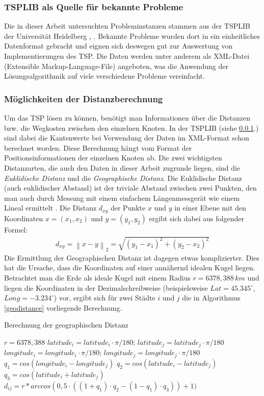 \documentclass[doktyp=barbeit, sprache=german]{TUBAFarbeiten}
\begin{document}
\subsubsection{TSPLIB als Quelle für bekannte Probleme} \label{TSPLIB}
Die in dieser Arbeit untersuchten Probleminstanzen stammen aus der TSPLIB der Universität Heidelberg \cite{TSPLIB}, \cite{WebsiteTSP}. Bekannte Probleme wurden dort in ein einheitliches Datenformat gebracht und eignen sich deswegen gut zur Auswertung von Implementierungen des TSP. Die Daten werden unter anderem als XML-Datei (Extensible Markup-Language-File) angeboten, was die Anwendung der Lösungsalgorithmik auf viele verschiedene Probleme vereinfacht. 
\subsubsection{Möglichkeiten der Distanzberechnung}
Um das TSP lösen zu können, benötigt man Informationen über die Distanzen bzw. die Wegkosten zwischen den einzelnen Knoten. In der TSPLIB (siehe \ref{TSPLIB}.) sind dabei die Kantenwerte bei Verwendung der Daten im XML-Format schon berechnet worden. Diese Berechnung hängt vom Format der Positionsinformationen der einzelnen Knoten ab. Die zwei wichtigsten Distanzarten, die auch den Daten in dieser Arbeit zugrunde liegen, sind die \textit{Euklidische Distanz} und die \textit{Geographische Distanz}. Die Euklidische Distanz (auch euklidischer Abstand) ist der triviale Abstand zwischen zwei Punkten, den man auch durch Messung mit einem einfachem Längenmessgerät wie einem Lineal ermittelt \cite{Distanz}. Die Distanz $d_{xy}$ der Punkte $x$ und $y$ in einer Ebene mit den Koordinaten $x = (x_1, x_2)$ und $y = (y_1, y_2)$ ergibt sich dabei aus folgender Formel:
\begin{align}
\label{eq:Euclid}
d_{xy} = \left\| x - y \right\|_2 = \sqrt{{(y_1-x_1)}^2+{(y_2-x_2)}^2}
\end{align}
Die Ermittlung der Geographischen Distanz ist dagegen etwas komplizierter. Dies hat die Ursache, dass die Koordinaten auf einer annähernd idealen Kugel liegen. Betrachtet man die Erde als ideale Kugel mit einem Radius $r = 6378,388 \,km$ und liegen die Koordinaten in der Dezimalschreibweise (beispielsweise $Lat=45.345^\circ$, $Long=-3.234^\circ$) vor, ergibt sich für zwei Städte $i$ und $j$ die in Algorithmus \ref{geodistance} vorliegende Berechnung.
\begin{algorithm}
\caption{Berechnung der geographischen Distanz}
\label{geodistance}
\begin{algorithmic}[1]
\State $r = 6378,388$
\State $latitude_i = latitude_i \cdot \pi / 180; \,latitude_j = latitude_j \cdot \pi / 180$
\State $longitude_i = longitude_i \cdot \pi / 180;\, longitude_j =longitude_j \cdot \pi / 180$
\State $q_1 = cos(longitude_i - longitude_j)$
\State $q_2 = cos(latitude_i - latitude_j)$
\State $q_3 = cos(latitude_i + latitude_j)$
\State \textbf{$d_{ij} = r * arccos(0,5 \cdot ((1 + q_1) \cdot q_2 - (1 - q_1) \cdot q_3)) + 1)$}
\end{algorithmic}
\end{algorithm}
\end{document}
